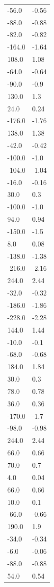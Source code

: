 \begin{longtable}{ll}
-56.0 & -0.56 \\
-88.0 & -0.88 \\
-82.0 & -0.82 \\
-164.0 & -1.64 \\
108.0 & 1.08 \\
-64.0 & -0.64 \\
-90.0 & -0.9 \\
130.0 & 1.3 \\
24.0 & 0.24 \\
-176.0 & -1.76 \\
138.0 & 1.38 \\
-42.0 & -0.42 \\
-100.0 & -1.0 \\
-104.0 & -1.04 \\
-16.0 & -0.16 \\
30.0 & 0.3 \\
-100.0 & -1.0 \\
94.0 & 0.94 \\
-150.0 & -1.5 \\
8.0 & 0.08 \\
-138.0 & -1.38 \\
-216.0 & -2.16 \\
244.0 & 2.44 \\
-32.0 & -0.32 \\
-186.0 & -1.86 \\
-228.0 & -2.28 \\
144.0 & 1.44 \\
-10.0 & -0.1 \\
-68.0 & -0.68 \\
184.0 & 1.84 \\
30.0 & 0.3 \\
78.0 & 0.78 \\
36.0 & 0.36 \\
-170.0 & -1.7 \\
-98.0 & -0.98 \\
244.0 & 2.44 \\
66.0 & 0.66 \\
70.0 & 0.7 \\
4.0 & 0.04 \\
66.0 & 0.66 \\
10.0 & 0.1 \\
-66.0 & -0.66 \\
190.0 & 1.9 \\
-34.0 & -0.34 \\
-6.0 & -0.06 \\
-88.0 & -0.88 \\
54.0 & 0.54 \\

\end{longtable}
